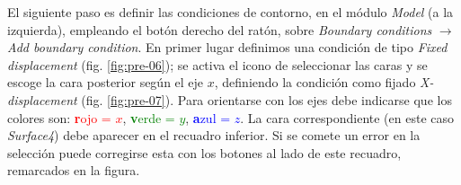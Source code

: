 El siguiente paso es definir las condiciones de contorno, en el módulo \emph{Model} (a la izquierda), empleando el botón derecho del ratón, sobre \emph{Boundary conditions} $\to$  \emph{Add boundary condition}.
En primer lugar definimos una condición de tipo \emph{Fixed displacement} (fig. \ref{fig:pre-06}); se activa el icono de seleccionar las caras y se escoge la cara posterior según el eje $x$, definiendo la condición como fijado \emph{X-displacement} (fig. \ref{fig:pre-07}).
Para orientarse con los ejes debe indicarse que los colores son: \textcolor{red}{\textbf rojo = $x$}, \textcolor{green}{\textbf verde = $y$}, \textcolor{blue}{\textbf azul = $z$}.
La cara correspondiente (en este caso \emph{Surface4}) debe aparecer en el recuadro inferior.
Si se comete un error en la selección puede corregirse esta con los botones al lado de este recuadro, remarcados en la figura.
